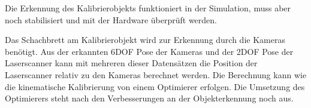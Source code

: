 Die Erkennung des Kalibrierobjekts
funktioniert in der Simulation, muss aber noch stabilisiert und mit der
Hardware überprüft werden.

Das Schachbrett am Kalibrierobjekt wird zur Erkennung durch die Kameras benötigt.
Aus der erkannten 6\ac{DOF} Pose der Kameras und der 2\ac{DOF} Pose der Laserscanner 
kann mit mehreren dieser Datensätzen die Position der Laserscanner relativ zu den
Kameras berechnet werden. Die Berechnung kann wie die kinematische Kalibrierung
von einem Optimierer erfolgen. Die Umsetzung des Optimierers steht nach den
Verbesserungen an der Objekterkennung noch aus. 

